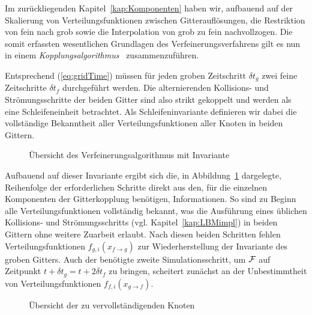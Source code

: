Im zurückliegenden Kapitel~\ref{kap:Komponenten} haben wir, aufbauend auf der Skalierung von Verteilungsfunktionen zwischen Gitterauflösungen, die Restriktion von fein nach grob sowie die Interpolation von grob zu fein nachvollzogen. Die somit erfassten wesentlichen Grundlagen des Verfeinerungsverfahrens gilt es nun in einem \emph{Kopplungsalgorithmus}~\cite[Kap.~3.5]{Lagrava12} zusammenzuführen.

\bigskip

Entsprechend (\ref{eq:gridTime}) müssen für jeden groben Zeitschritt \(\delta t_g\) zwei feine Zeitschritte \(\delta t_f\) durchgeführt werden. Die alternierenden Kollisions- und Strömungsschritte der beiden Gitter sind also strikt gekoppelt und werden als eine Schleifeneinheit betrachtet. Als Schleifeninvariante definieren wir dabei die vollständige Bekanntheit aller Verteilungsfunktionen aller Knoten in beiden Gittern.

\begin{figure}[h]

\caption{Übersicht des Verfeinerungsalgorithmus mit Invariante}
\label{fig:AlgorithmBirdsEye}
\end{figure}
\noindent
Aufbauend auf dieser Invariante ergibt sich die, in Abbildung~\ref{fig:AlgorithmBirdsEye} dargelegte, Reihenfolge der erforderlichen Schritte direkt aus den, für die einzelnen Komponenten der Gitterkopplung benötigen, Informationen. So sind zu Beginn alle Verteilungsfunktionen vollständig bekannt, was die Ausführung eines üblichen Kollisions- und Strömungsschritts (vgl. Kapitel~\ref{kap:LBMimpl}) in beiden Gittern ohne weitere Zuarbeit erlaubt. Nach diesen beiden Schritten fehlen Verteilungsfunktionen \(f_{g,i}(x_{f \to g})\) zur Wiederherstellung der Invariante des groben Gitters. Auch der benötigte zweite Simulationsschritt, um \(\mathcal{F}\) auf Zeitpunkt \(t+\delta t_g=t+2\delta t_f\) zu bringen, scheitert zunächst an der Unbestimmtheit von Verteilungsfunktionen \(f_{f,i}(x_{g \to f})\).

\begin{figure}[h]
\centering

\caption{Übersicht der zu vervollständigenden Knoten}
\end{figure}

